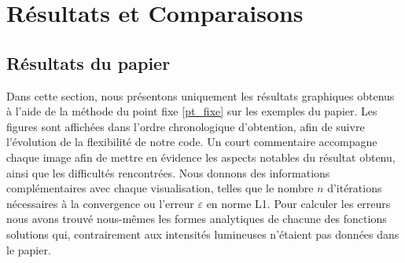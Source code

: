 \section{Résultats et Comparaisons}
\subsection{Résultats du papier}

Dans cette section, nous présentons uniquement les résultats graphiques obtenus à l'aide de la méthode du point fixe \eqref{pt_fixe} sur les exemples du papier. Les figures sont affichées dans l'ordre chronologique d'obtention, afin de suivre l'évolution de la flexibilité de notre code. Un court commentaire accompagne chaque image afin de mettre en évidence les aspects notables du résultat obtenu, ainsi que les difficultés rencontrées. Nous donnons des informations complémentaires avec chaque visualisation, telles que le nombre $n$ d'itérations nécessaires à la convergence ou l'erreur $\varepsilon$ en norme L1. Pour calculer les erreurs nous avons trouvé nous-mêmes les formes analytiques de chacune des fonctions solutions qui, contrairement aux intensités lumineuses n'étaient pas données dans le papier.

